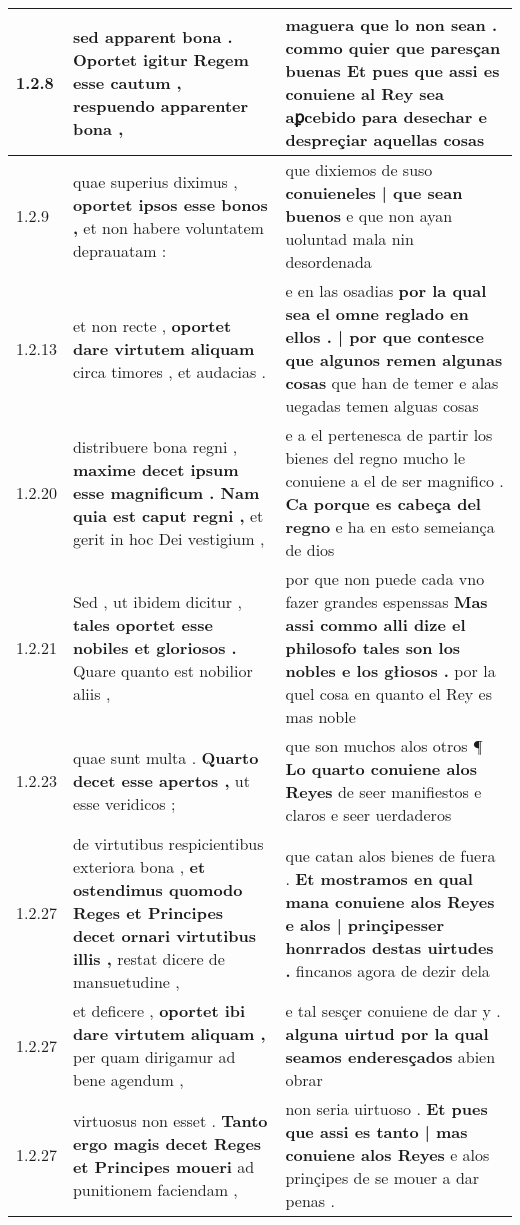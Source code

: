 \begin{tabular}{|p{1cm}|p{6.5cm}|p{6.5cm}|}
1.2.8 & sed apparent bona . \textbf{ Oportet igitur Regem esse cautum , } respuendo apparenter bona , & maguera que lo non sean . \textbf{ commo quier que paresçan buenas Et pues que assi es conuiene al Rey sea aꝑcebido } para desechar e despreçiar aquellas cosas \\\hline
1.2.9 & quae superius diximus , \textbf{ oportet ipsos esse bonos , } et non habere voluntatem deprauatam : & que dixiemos de suso \textbf{ conuieneles | que sean buenos } e que non ayan uoluntad mala nin desordenada \\\hline
1.2.13 & et non recte , \textbf{ oportet dare virtutem aliquam } circa timores , et audacias . & e en las osadias \textbf{ por la qual sea el omne reglado en ellos . | por que contesce que algunos remen algunas cosas } que han de temer e alas uegadas temen alguas cosas \\\hline
1.2.20 & distribuere bona regni , \textbf{ maxime decet ipsum esse magnificum . Nam quia est caput regni , } et gerit in hoc Dei vestigium , & e a el pertenesca de partir los bienes del regno mucho le conuiene a el de ser magnifico . \textbf{ Ca porque es cabeça del regno } e ha en esto semeiança de dios \\\hline
1.2.21 & Sed , ut ibidem dicitur , \textbf{ tales oportet esse nobiles et gloriosos . } Quare quanto est nobilior aliis , & por que non puede cada vno fazer grandes espenssas \textbf{ Mas assi commo alli dize el philosofo tales son los nobles e los głiosos . } por la quel cosa en quanto el Rey es mas noble \\\hline
1.2.23 & quae sunt multa . \textbf{ Quarto decet esse apertos , } ut esse veridicos ; & que son muchos alos otros ¶ \textbf{ Lo quarto conuiene alos Reyes } de seer manifiestos e claros e seer uerdaderos \\\hline
1.2.27 & de virtutibus respicientibus exteriora bona , \textbf{ et ostendimus quomodo Reges et Principes decet ornari virtutibus illis , } restat dicere de mansuetudine , & que catan alos bienes de fuera . \textbf{ Et mostramos en qual mana conuiene alos Reyes e alos | prinçipesser honrrados destas uirtudes . } fincanos agora de dezir dela \\\hline
1.2.27 & et deficere , \textbf{ oportet ibi dare virtutem aliquam , } per quam dirigamur ad bene agendum , & e tal sesçer conuiene de dar y . \textbf{ alguna uirtud por la qual seamos enderesçados } abien obrar \\\hline
1.2.27 & virtuosus non esset . \textbf{ Tanto ergo magis decet Reges et Principes moueri } ad punitionem faciendam , & non seria uirtuoso . \textbf{ Et pues que assi es tanto | mas conuiene alos Reyes } e alos prinçipes de se mouer a dar penas . \\\hline

\end{tabular}
